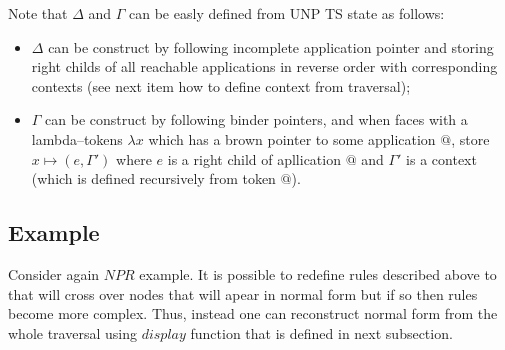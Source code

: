 \documentclass[a4paper, 10pt]{article}
\begin{document}
Note that $\Delta$ and $\Gamma$ can be easly defined from UNP TS state as follows:
\begin{itemize}
\item $\Delta$ can be construct by following incomplete application pointer and storing right childs of all reachable applications in reverse order with corresponding contexts (see next item how to define context from traversal);
\item $\Gamma$ can be construct by following binder pointers, and when faces with a lambda--tokens $\lambda x$ which has a brown pointer to some application $@$, store $x \mapsto (e, \Gamma')$ where $e$ is a right child of apllication $@$ and $\Gamma'$ is a context (which is defined recursively from token $@$).
\end{itemize}

\subsection{Example}
Consider again $NPR$ example. It is possible to redefine rules described above to that will cross over nodes that will apear in normal form but if so then rules become more complex. Thus, instead one can reconstruct normal form from the whole traversal using $display$ function that is defined in next subsection.
\end{document}
